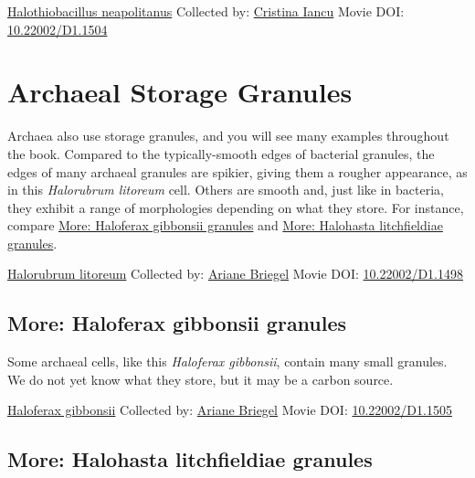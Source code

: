\documentclass[]{tufte-book}
\begin{document}
\label{fig:4-9b}\protect\hyperlink{tree}{Halothiobacillus neapolitanus} Collected by: \protect\hyperlink{cristina_iancu}{Cristina Iancu} Movie DOI: \href{https://doi.org/10.22002/D1.1504}{10.22002/D1.1504}

\hypertarget{archaeal-storage-granules}{%
\section{Archaeal Storage Granules}\label{archaeal-storage-granules}}

Archaea also use storage granules, and you will see many examples throughout the book. Compared to the typically-smooth edges of bacterial granules, the edges of many archaeal granules are spikier, giving them a rougher appearance, as in this \emph{Halorubrum litoreum} cell. Others are smooth and, just like in bacteria, they exhibit a range of morphologies depending on what they store. For instance, compare \protect\hyperlink{Haloferax_gibbonsii_granules}{More: Haloferax gibbonsii granules} and \protect\hyperlink{Halohasta_litchfieldiae_granules}{More: Halohasta litchfieldiae granules}.



\hypertarget{htmlwidget-3b48ee7adde9a4ab7862}{}

\label{fig:4-10}\protect\hyperlink{tree}{Halorubrum litoreum} Collected by: \protect\hyperlink{ariane_briegel}{Ariane Briegel} Movie DOI: \href{https://doi.org/10.22002/D1.1498}{10.22002/D1.1498}

\hypertarget{Haloferax_gibbonsii_granules}{%
\subsection*{More: Haloferax gibbonsii granules}\label{Haloferax_gibbonsii_granules}}

Some archaeal cells, like this \emph{Haloferax gibbonsii}, contain many small granules. We do not yet know what they store, but it may be a carbon source.



\hypertarget{htmlwidget-c7564301c382256dcc77}{}

\label{fig:4-10a}\protect\hyperlink{tree}{Haloferax gibbonsii} Collected by: \protect\hyperlink{ariane_briegel}{Ariane Briegel} Movie DOI: \href{https://doi.org/10.22002/D1.1505}{10.22002/D1.1505}

\hypertarget{Halohasta_litchfieldiae_granules}{%
\subsection*{More: Halohasta litchfieldiae granules}\label{Halohasta_litchfieldiae_granules}}
\end{document}
